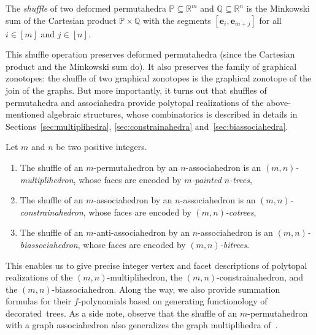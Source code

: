 \documentclass[AHL,Unicode,longabstracts,published]{cedram}
\newcommand{\R}{\mathbb{R}}
\renewcommand{\b}[1]{\boldsymbol{#1}}
\newcommand{\polytope}[1]{\mathds{#1}}
\begin{document}
\begin{defi}
The
\emph{shuffle} of two deformed permutahedra $\polytope{P} \subseteq \R^m$ \linebreak and $\polytope{Q} \subseteq \R^n$ is the Minkowski sum of the Cartesian product $\polytope{P} \times \polytope{Q}$ with the \linebreak segments $[\b{e}_i, \b{e}_{m+j}]$ for all $i \in [m]$ and $j \in [n]$.
\end{defi}

This shuffle operation preserves deformed permutahedra (since the Cartesian product and the Minkowski sum do). It also preserves the family of graphical zonotopes: the shuffle of two graphical zonotopes is the graphical zonotope of the join of the graphs. But more importantly, it turns out that shuffles of permutahedra and associahedra provide polytopal realizations of the above-mentioned algebraic structures, whose combinatorics is described in details in Sections~\ref{sec:multiplihedra}, \ref{sec:constrainahedra} and~\ref{sec:biassociahedra}.

\begin{prop}
Let $m$ and $n$ be two positive integers.
\begin{enumerate}
\item\label{prop0.2.1} The shuffle of an $m$-permutahedron by an $n$-associahedron is an \linebreak
\emph{$(m,n)$-multiplihedron}, whose faces are encoded by
\emph{$m$-painted $n$-trees},
\item\label{prop0.2.2} The shuffle of an $m$-associahedron by an $n$-associahedron is an
\emph{$(m,n)$-cons\-trainahedron}, whose faces are encoded by
\emph{$(m,n)$-cotrees},
\item\label{prop0.2.3} The shuffle of an $m$-anti-associahedron by an $n$-associahedron is an \linebreak
\emph{$(m,n)$-biassociahedron}, whose faces are encoded by
\emph{$(m,n)$-bitrees}.
\end{enumerate}
\end{prop}

This enables us to give precise integer vertex and facet descriptions of polytopal realizations of the $(m,n)$-multiplihedron, the $(m,n)$-constrainahedron, and the $(m,n)$-biassociahedron. Along the way, we also provide summation formulas for their $f$-polynomials based on generating functionology of decorated~trees. As a side note, observe that the shuffle of an $m$-permutahedron with a graph associahedron also generalizes the graph multiplihedra of~\cite{DevadossForcey}.
\end{document}
